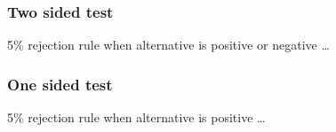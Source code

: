 \documentclass[handout]{beamer}
\begin{document}


   \begin{frame}
   \frametitle{Two sided test}
   \begin{center}
   \end{center}
   {\color{blue} 5\% rejection rule} when alternative is positive or negative \dots
   \end{frame}



   \begin{frame}
   \frametitle{One sided test}
   \begin{center}
   \end{center}
   {\color{blue} 5\% rejection rule} when alternative is positive \dots
   \end{frame}
\end{document}
